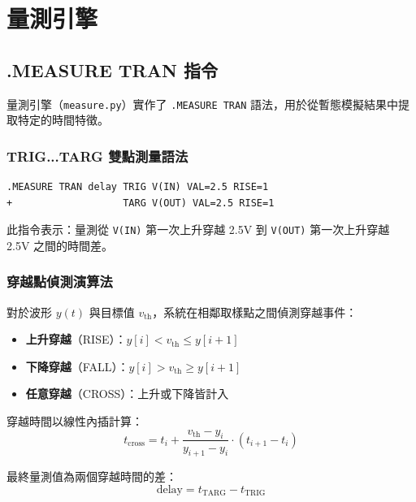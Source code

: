 \documentclass[12pt,a4paper]{article}
\begin{document}
\section{量測引擎}

\subsection{.MEASURE TRAN 指令}

量測引擎（\texttt{measure.py}）實作了 \texttt{.MEASURE TRAN} 語法，用於從暫態模擬結果中提取特定的時間特徵。

\subsubsection{TRIG...TARG 雙點測量語法}

\begin{lstlisting}[language=SPICE]
.MEASURE TRAN delay TRIG V(IN) VAL=2.5 RISE=1
+                   TARG V(OUT) VAL=2.5 RISE=1
\end{lstlisting}

此指令表示：量測從 \texttt{V(IN)} 第一次上升穿越 2.5V 到 \texttt{V(OUT)} 第一次上升穿越 2.5V 之間的時間差。

\subsubsection{穿越點偵測演算法}

對於波形 $y(t)$ 與目標值 $v_{\text{th}}$，系統在相鄰取樣點之間偵測穿越事件：

\begin{itemize}
  \item \textbf{上升穿越}（RISE）：$y[i] < v_{\text{th}} \leq y[i+1]$
  \item \textbf{下降穿越}（FALL）：$y[i] > v_{\text{th}} \geq y[i+1]$
  \item \textbf{任意穿越}（CROSS）：上升或下降皆計入
\end{itemize}

穿越時間以線性內插計算：
\begin{equation}
t_{\text{cross}} = t_i + \frac{v_{\text{th}} - y_i}{y_{i+1} - y_i} \cdot (t_{i+1} - t_i)
\end{equation}

最終量測值為兩個穿越時間的差：
\begin{equation}
\text{delay} = t_{\text{TARG}} - t_{\text{TRIG}}
\end{equation}
\end{document}
